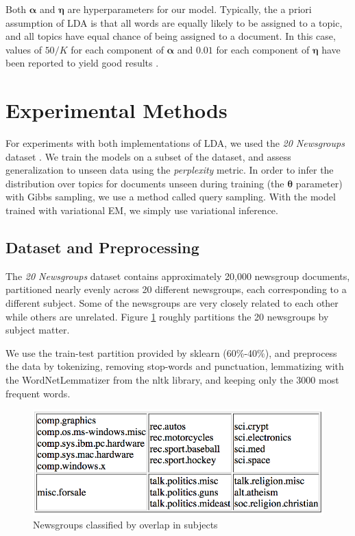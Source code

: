 \documentclass{article}
\begin{document}
Both $\bm{\alpha}$ and $\bm{\eta}$ are hyperparameters for our model. Typically, the a priori assumption of LDA is that all words are equally likely to be assigned to a topic, and all topics have equal chance of being assigned to a document. In this case, values of $50/K$ for each component of $\bm{\alpha}$ and $0.01$ for each component of $\bm{\eta}$ have been reported to yield good results \cite{griffiths2004finding}.

\section{Experimental Methods}
For experiments with both implementations of LDA, we used the \textit{20 Newsgroups} dataset \cite{20_newsgroups}. We train the models on a subset of the dataset, and assess generalization to unseen data using the \textit{perplexity} metric. In order to infer the distribution over topics for documents unseen during training (the $\bm{\theta}$ parameter) with Gibbs sampling, we use a method called query sampling. With the model trained with variational EM, we simply use variational inference. 

\subsection{Dataset and Preprocessing}
The \textit{20 Newsgroups} dataset contains approximately 20,000 newsgroup documents, partitioned nearly evenly across 20 different newsgroups, each corresponding to a different subject. Some of the newsgroups are very closely related to each other while others are unrelated. Figure \ref{20_newsgroups} roughly partitions the 20 newsgroups by subject matter. 

We use the train-test partition provided by sklearn (60\%-40\%), and preprocess the data by tokenizing, removing stop-words and punctuation, lemmatizing with the WordNetLemmatizer from the nltk library, and keeping only the 3000 most frequent words.

\begin{figure}[ht]
\vskip 0.2in
\begin{center}
\centerline{\includegraphics[width=\columnwidth]{20_newsgroups}}
\caption{Newsgroups classified by overlap in subjects}
\label{20_newsgroups}
\end{center}
\vskip -0.2in
\end{figure} 
\end{document}
